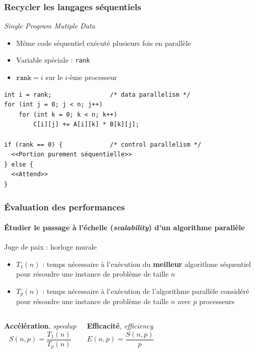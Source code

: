\documentclass[xcolor={x11names,svgnames}]{beamer}
\begin{document}
\begin{frame}[fragile]
  \frametitle{Recycler les langages séquentiels}


  \begin{block}{\emph{Single Program Mutiple Data}}
    \begin{itemize}
    \item Même code séquentiel exécuté plusieurs fois en parallèle
    \item Variable spéciale : \texttt{rank}
    \item $\texttt{rank} = i$ sur le $i$-ème processeur
    \end{itemize}
  \end{block}

  \medskip
  
  \begin{verbatim}
int i = rank;                /* data parallelism */
for (int j = 0; j < n; j++)
    for (int k = 0; k < n; k++)
        C[i][j] += A[i][k] * B[k][j];

if (rank == 0) {             /* control parallelism */
  <<Portion purement séquentielle>>
} else {
  <<Attend>>
}
\end{verbatim}
\end{frame}



\begin{frame}
\frametitle{Évaluation des performances}
\framesubtitle{Étudier le passage à l'échelle (\emph{scalability}) d'un algorithme parallèle}

Juge de paix : \alert{horloge murale}

\medskip

\begin{itemize}
\item $T_1(n)$ : temps nécessaire à l'exécution du \textbf{meilleur} algorithme
  séquentiel pour résoudre une instance de problème de taille $n$

  \medskip
  
\item $T_p(n)$ : temps nécessaire à l'exécution de l'algorithme parallèle
  considéré pour résoudre une instance de problème de taille $n$ avec $p$
  processeurs
\end{itemize}

\vspace*{-0.5cm}
\begin{columns}[t]

\begin{block}{\textbf{Accélération}, \emph{speedup}}
  \[
    S(n,p)  =  \frac{T_1(n)}{T_p(n)}
  \]
\end{block}

\begin{block}{{\bf Efficacité}, {\it efficiency}}
  \[
    E(n,p)  = \frac{S(n,p)}{p}
  \]
\end{block}
\end{columns}
\end{frame}
\end{document}

